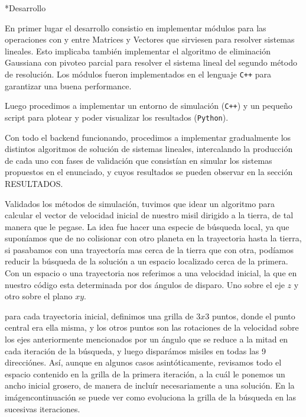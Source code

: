 \documentclass[12pt,titlepage]{article}
\newenvironment{usection}[1]{\newpage\begin{section}*{#1}	\addcontentsline{toc}{section}{#1}}{\end{section}}
\begin{document}
	\begin{usection}{Desarrollo}

		En primer lugar el desarrollo consistio en implementar módulos
		para las operaciones con y entre Matrices y Vectores que
		sirviesen para resolver sistemas lineales. Esto implicaba
		también implementar el algoritmo de eliminación Gaussiana con
		pivoteo parcial para resolver el sistema lineal del segundo
		método de resolución. Los módulos fueron implementados en el
		lenguaje \texttt{C++} para garantizar una buena performance.

		Luego procedimos a implementar un entorno de simulación
		(\texttt{C++}) y un pequeño script para plotear y poder
		visualizar los resultados (\texttt{Python}). 

		Con todo el backend funcionando, procedimos a implementar
		gradualmente los distintos algoritmos de solución de sistemas
		lineales, intercalando la producción de cada uno con fases de
		validación que consistían en simular los sistemas propuestos
		en el enunciado, y cuyos resultados se pueden observar en la
		sección RESULTADOS.

		Validados los métodos de simulación, tuvimos que idear un
		algoritmo para calcular el vector de velocidad inicial de
		nuestro misil dirigido a la tierra, de tal manera que le pegase.
		La idea fue hacer una especie de búsqueda local, ya que
		suponíamos que de no colisionar con otro planeta en la
		trayectoria hasta la tierra, si pasabamos con una trayectoría
		mas cerca de la tierra que con otra, podíamos reducir la
		búsqueda de la solución a un espacio localizado cerca de la
		primera. Con un espacio o una trayectoria nos referimos a una
		velocidad inicial, la que en nuestro código esta determinada por
		dos ángulos de disparo. Uno sobre el eje $z$ y otro sobre el
		plano $xy$.

		para cada trayectoria inicial, definimos una grilla de $3x3$
		puntos, donde el punto central era ella misma, y los otros
		puntos son las rotaciones de la velocidad sobre los ejes
		anteriormente mencionados por un ángulo que se reduce a la
		mitad en cada iteración de la búsqueda, y luego disparámos
		misiles en todas las 9 direcciónes.
		Así, aunque en algunos casos asintóticamente,
		revisamos todo el espacio contenido en la grilla de la primera
		iteración, a la cuál le ponemos un ancho inicial grosero, de
		manera de incluír necesariamente a una solución.
		En la imágencontinuación se puede ver como evoluciona la grilla
		de la búsqueda en las sucesivas iteraciones.


\end{usection}
\end{document}
